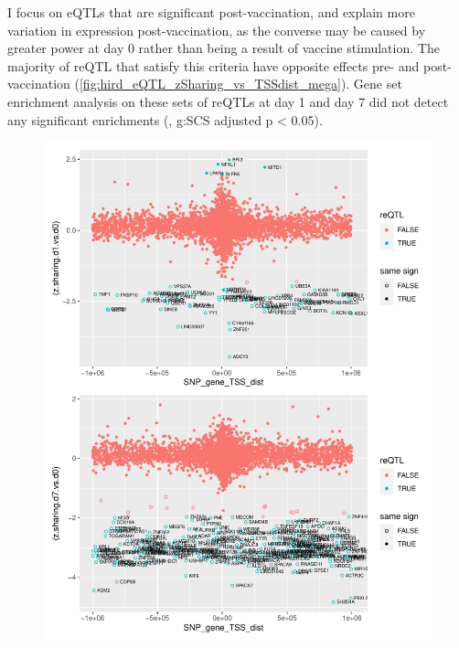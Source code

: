 I focus on \glspl{eQTL} that are significant post-vaccination, and explain more variation in expression post-vaccination, as the converse may be caused by greater power at day 0 rather than being a result of vaccine stimulation.
The majority of \gls{reQTL} that satisfy this criteria have opposite effects pre- and post-vaccination (\autoref{fig:hird_eQTL_zSharing_vs_TSSdist_mega}).
Gene set enrichment analysis on these sets of \glspl{reQTL} at day 1 and day 7 did not detect any significant enrichments (, g:SCS adjusted p < 0.05).

\begin{figure}
    \centering
    \includegraphics[width=1.0\textwidth]{mainmatter/figures/chapter_03/compare_dge_eqtl.z_sharing.vs.SNP_gene_TSS_dist.pdf}
    \caption{}
    \label{fig:hird_eQTL_zSharing_vs_TSSdist_mega}
\end{figure}

